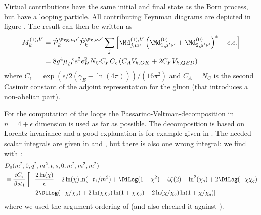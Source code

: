 Virtual contributions have the same initial and final state as the Born process, but have a looping particle. All contributing Feynman diagrams are depicted in figure .
The result can then be written as
\begin{align}
M_k^{(1),V} &= \hat {\mathcal P}_{k}^{\Pgg,\mu\mu'}\hat {\mathcal P}_{k}^{\Pg,\nu\nu'}\sum_{j}\left[\Md^{(1),V}_{j,\mu\nu}\left(\Md^{(0)}_{1,\mu'\nu'}+\Md^{(0)}_{2,\mu'\nu'}\right)^*+c.c.\right] \nonumber\\
 &= 8g^4\mu_D^{-\epsilon}e^2e_H^2 N_C C_FC_\epsilon\left( C_A V_{k,OK} + 2C_F V_{k,QED}\right)
\end{align}
where $C_\epsilon = \exp(\epsilon/2(\gamma_E-\ln(4\pi)))/(16\pi^2)$ and $C_A=N_C$ is the second Casimir constant of the adjoint representation for the gluon (that introduces a non-abelian part).

For the computation of the loops the Passarino-Veltman-decomposition\cite{Passarino:1978jh} in $n=4+\epsilon$ dimension is used as far as possible. The decomposition is based on Lorentz invariance and a good explanation is for example given in \cite{Bojak:2000eu}. The needed scalar integrals are given in \cite{PhysRevD4054} and \cite{Laenen1993162}, but there is also one wrong integral: we find with \cite[Box 16]{Ellis:2007qk}:
\begin{align}
&D_0(m^2,0,q^2,m^2,t,s,0,m^2,m^2,m^2)\nonumber\\
 &=\frac{i C_\epsilon}{\beta s t_1}\left[-\frac{2\ln(\chi)}{\epsilon} -2\ln(\chi)\ln(-t_1/m^2)+\DiLog(1-\chi^2)-4\zeta(2)+\ln^2(\chi_q) + 2\DiLog(-\chi\chi_q)\right.\nonumber\\
 &\hspace{40pt}\left. +2\DiLog(-\chi/\chi_q)+2\ln(\chi\chi_q)\ln(1+\chi\chi_q)+2\ln(\chi/\chi_q)\ln(1+\chi/\chi_q)\right]
\end{align}
where we used the argument ordering of \LoopTools\cite{Hahn:1998yk,LoopTools212Guide} (and also checked it against \LoopTools).

